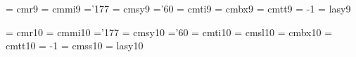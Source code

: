  
 \font\ninrm  = cmr9               %
 \font\ninmi  = cmmi9              %
    \skewchar\ninmi ='177          %
 \font\ninsy  = cmsy9              %
    \skewchar\ninsy ='60           %
 \font\ninit  = cmti9              %
 \font\ninbf  = cmbx9              %
 \font\nintt  = cmtt9              %
    \hyphenchar\nintt = -1         %
 \font\ninly  = lasy9             %
 
 \font\tenrm  = cmr10    %
 \font\tenmi  = cmmi10   %
    \skewchar\tenmi ='177  %
 \font\tensy  = cmsy10   %
    \skewchar\tensy ='60 %
 \font\tenit  = cmti10   %
 \font\tensl  = cmsl10   %
 \font\tenbf  = cmbx10   %
 \font\tentt  = cmtt10   %
    \hyphenchar\tentt = -1         %
 \font\tensf  = cmss10   %
 \font\tenly  = lasy10  %
 
